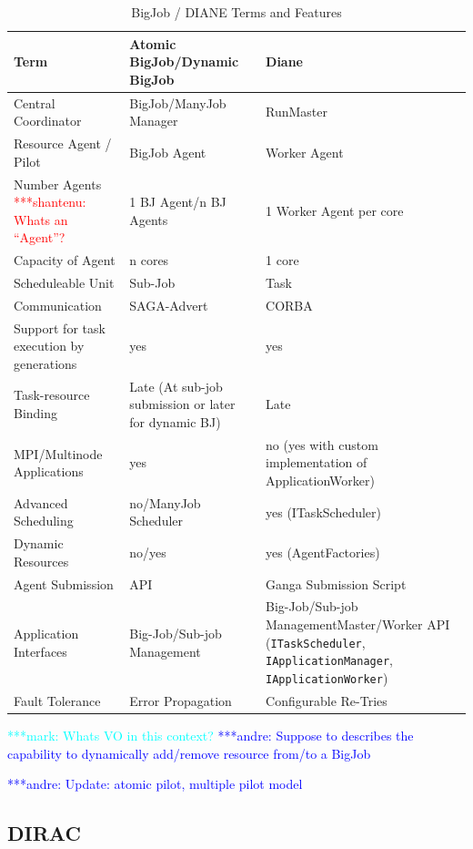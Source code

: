 \documentclass[conference,final]{IEEEtran}
\newcommand{\jhanote}[1]{ {\textcolor{red} { ***shantenu: #1 }}}
\newcommand{\alnote}[1]{ {\textcolor{blue} { ***andre: #1 }}}
\newcommand{\msnote}[1]{ {\textcolor{cyan} { ***mark: #1 }}}
\newcommand{\alnote}[1]{}
\newcommand{\jhanote}[1]{}
\begin{document}
\begin{table}[t]
\centering
\begin{tabular}{|p{3.5cm}|p{5.9cm}|p{5.7cm}|}
\hline
\textbf{Term} &\textbf{Atomic BigJob/Dynamic BigJob} &\textbf{Diane}  \\
\hline
Central Coordinator &BigJob/ManyJob Manager & RunMaster \\ 
\hline
Resource Agent / Pilot &BigJob Agent  & Worker Agent \\
\hline
Number Agents \jhanote{Whats an ``Agent''?}  &1 BJ Agent/n BJ Agents & 1 Worker Agent per core \\
\hline
Capacity of Agent &n cores & 1 core\\
\hline
Scheduleable Unit&Sub-Job &  Task \\
\hline
Communication &SAGA-Advert & CORBA\\
\hline
Support for task execution by generations  &yes &yes\\  
\hline
Task-resource Binding &Late (At sub-job submission or later for dynamic BJ) &Late\\
\hline
MPI/Multinode Applications &yes &no (yes with custom implementation of ApplicationWorker)\\
\hline
Advanced Scheduling &no/ManyJob Scheduler &yes (ITaskScheduler)\\
\hline
Dynamic Resources &no/yes &yes (AgentFactories)\\
\hline
Agent Submission &API &Ganga Submission Script\\
\hline
Application Interfaces &Big-Job/Sub-job Management &Big-Job/Sub-job 
Management\linebreak[4] Master/Worker API (\texttt{ITaskScheduler}, 
\texttt{IApplicationManager}, \texttt{IApplicationWorker}) \\
\hline
Fault Tolerance &Error Propagation &Configurable Re-Tries\\
\hline
\end{tabular}
\caption{BigJob / DIANE Terms and Features}
\end{table}

\msnote{Whats VO in this context?}\alnote{Suppose to describes the capability to dynamically add/remove resource from/to a BigJob}


\alnote{Update: atomic pilot, multiple pilot model}


\subsection{DIRAC}
\end{document}
